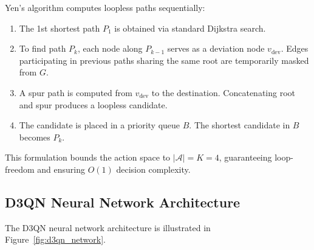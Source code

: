 \documentclass[12pt,a4paper,oneside]{report}
\begin{document}
Yen's algorithm computes loopless paths sequentially:
\begin{enumerate}
    \item The 1st shortest path $P_1$ is obtained via standard Dijkstra search.
    \item To find path $P_k$, each node along $P_{k-1}$ serves as a deviation node $v_{\text{dev}}$. Edges participating in previous paths sharing the same root are temporarily masked from $G$.
    \item A spur path is computed from $v_{\text{dev}}$ to the destination. Concatenating root and spur produces a loopless candidate.
    \item The candidate is placed in a priority queue $B$. The shortest candidate in $B$ becomes $P_k$.
\end{enumerate}
This formulation bounds the action space to $|\mathcal{A}| = K = 4$, guaranteeing loop-freedom and ensuring $O(1)$ decision complexity.

\subsection{D3QN Neural Network Architecture}
The D3QN neural network architecture is illustrated in Figure~\ref{fig:d3qn_network}.
\end{document}
